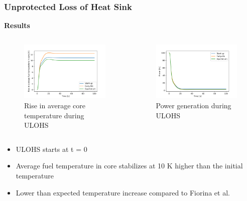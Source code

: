 \begin{frame}
	\frametitle{Unprotected Loss of Heat Sink}
		\textbf{Results}
		\begin{columns}
			\column[t]{5.5cm}
			\begin{figure}
				\centering
				\includegraphics[width=\textwidth]{../paper/figures/loscatemp}
				\caption{Rise in average core temperature during \gls{ULOHS}}
			\end{figure}
			\column[t]{5.5cm}
			\begin{figure}
				\centering
				\includegraphics[width=\textwidth]{./images/loscaheat}
				\caption{Power generation during \gls{ULOHS}}
			\end{figure}
		\end{columns}
		\begin{itemize}
			\item \gls{ULOHS} starts at t = 0
			\item Average fuel temperature in core stabilizes at 10 K higher than
			the initial temperature
			\item Lower than expected temperature increase compared to Fiorina
			et al. \cite{fiorina_investigation_2013}
		\end{itemize}
\end{frame}
